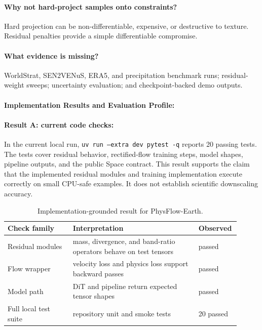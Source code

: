 \documentclass{article}
\begin{document}
\paragraph{Why not hard-project samples onto constraints?}
Hard projection can be non-differentiable, expensive, or destructive to texture. Residual penalties provide a simple differentiable compromise.

\paragraph{What evidence is missing?}
WorldStrat, SEN2VENuS, ERA5, and precipitation benchmark runs; residual-weight sweeps; uncertainty evaluation; and checkpoint-backed demo outputs.

\paragraph{Implementation Results and Evaluation Profile:}

\paragraph{Result A: current code checks:}

In the current local run, \texttt{uv run --extra dev pytest -q} reports 20 passing tests. The tests cover residual behavior, rectified-flow training steps, model shapes, pipeline outputs, and the public Space contract. This result supports the claim that the implemented residual modules and training implementation execute correctly on small CPU-safe examples. It does not establish scientific downscaling accuracy.

\begin{table}[t]
\centering
\caption{Implementation-grounded result for PhysFlow-Earth.}
\begin{tabular}{@{}p{0.27\linewidth}p{0.52\linewidth}p{0.12\linewidth}@{}}
\toprule
\textbf{Check family} & \textbf{Interpretation} & \textbf{Observed}\\
\midrule
Residual modules & mass, divergence, and band-ratio operators behave on test tensors & passed\\
Flow wrapper & velocity loss and physics loss support backward passes & passed\\
Model path & DiT and pipeline return expected tensor shapes & passed\\
Full local test suite & repository unit and smoke tests & 20 passed\\
\bottomrule
\end{tabular}
\end{table}
\end{document}
